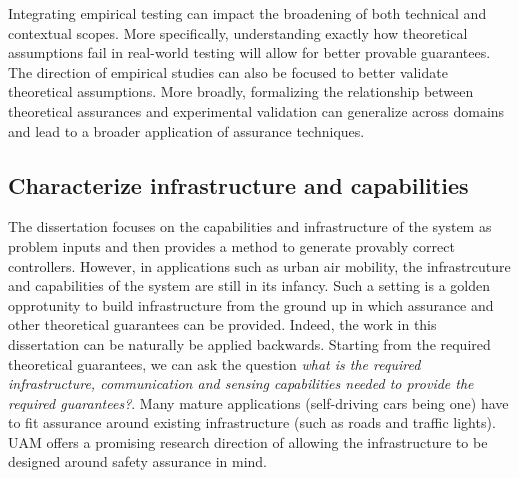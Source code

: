 Integrating empirical testing can impact the broadening of both technical and contextual scopes. More specifically, understanding exactly how theoretical assumptions fail in real-world testing will allow for better provable guarantees. The direction of empirical studies can also be focused to better validate theoretical assumptions. More broadly, formalizing the relationship between theoretical assurances and experimental validation can generalize across domains and lead to a broader application of assurance techniques. 

\subsection{Characterize infrastructure and capabilities}
The dissertation focuses on the capabilities and infrastructure of the system as problem inputs and then provides a method to generate provably correct controllers. However, in applications such as urban air mobility, the infrastrcuture and capabilities of the system are still in its infancy. Such a setting is a golden opprotunity to build infrastructure from the ground up in which assurance and other theoretical guarantees can be provided. Indeed, the work in this dissertation can be naturally be applied backwards. Starting from the required theoretical guarantees, we can ask the question \emph{what is the required infrastructure, communication and sensing capabilities needed to provide the required guarantees?}. Many mature applications (self-driving cars being one) have to fit assurance around existing infrastructure (such as roads and traffic lights). UAM offers a promising research direction of allowing the infrastructure to be designed around safety assurance in mind. 

